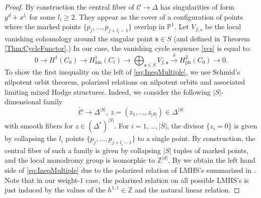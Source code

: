 \documentclass[12pt, letterpaper]{amsart}
\theoremstyle{plain}
\theoremstyle{definition}
\newcommand{\s}{\mathfrak{s}}
\begin{document}
\begin{proof}
By construction the central fiber of $\mathcal{C} \to \Delta$ has singularities of form $y^d + x^{l_i}$ for some $l_i\geq 2$. They appear as the cover of a configuration of points where the marked points $\{p_{j},...,p_{j+l_i-1}\}$ overlap in $\mathbb{P}^1$.
Let $V_{f,s}$ be the local vanishing cohomology around the singular point 
$ \mathfrak{s}\in S$ (and defined in Theorem \ref{Thm:CycleFunctor}.)
In our case, the vanishing cycle sequence \eqref{vcs} is equal to:
\begin{equation}\label{eq:VaniCycleMultiple}
    0\rightarrow 
    H^1(C_0)\xrightarrow{}{}
    H^1_{\mathrm{lim}}(C_t)
    \xrightarrow{}
    \bigoplus_{\s \in S}
    V_{f,\s}\xrightarrow{\delta}H^2_{\mathrm{ph}}(C_0)\rightarrow 0.
\end{equation}
To show the first inequality on the left of \eqref{eq:IneqMultiple}, we use Schmid's nilpotent orbit theorem, polarized relations on nilpotent orbits and associated limiting mixed Hodge structures.  Indeed, we
consider the following $|S|$-dimensional family
\begin{equation}
    \mathcal{\tilde{C}}\rightarrow \Delta^{|S|}, \ z=(z_1,...,z_{|S|})\in \Delta^{|S|}
\end{equation}
with smooth fibers for $z\in (\Delta^{*})^{|S|}$. For $i=1,...,|S|$, the divisor $\{z_i=0\}$ is given by collapsing the $l_i$ points $\{p_{j},...,p_{j+l_i-1}\}$ to a single point. By construction, the central fiber of such a family is given by collapsing $|S|$ tuples of marked points, and the local monodromy group is isomorphic to $\mathbb{Z}^{|S|}$. By \cite[Sec. 3]{KPR19} we obtain the left hand side of \eqref{eq:IneqMultiple} due to the polarized relation of LMHS's summarized in \cite[Sec. 1]{KPR19}. Note that in our weight-$1$ case, the polarized relation on all possible LMHS's is just induced by the values of the $h^{1,1}\in \mathbb{Z}$ and the natural linear relation. 


\end{proof}
\end{document}
